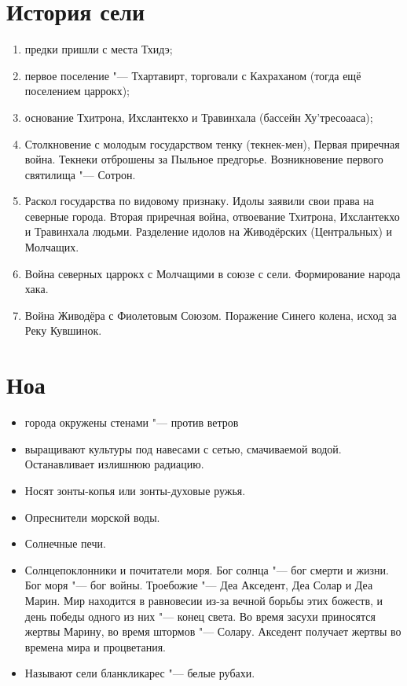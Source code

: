 \documentclass[a4paper,10pt]{book}
\begin{document}
\section{История сели}

\begin{enumerate}
\item предки пришли с места Тхидэ;
\item первое поселение "--- Тхартавирт, торговали с Кахраханом (тогда ещё 
поселением 
царрокх);
\item основание Тхитрона, Ихслантекхо и Травинхала (бассейн Ху'тресоааса);
\item Столкновение с молодым государством тенку (текнек-мен), Первая приречная 
война. 
Текнеки отброшены за Пыльное предгорье. Возникновение первого святилища "--- 
Сотрон.
\item Раскол государства по видовому признаку. Идолы заявили свои права на 
северные 
города. Вторая приречная война, отвоевание Тхитрона, Ихслантекхо и Травинхала 
людьми. Разделение идолов на Живодёрских (Центральных) и Молчащих.
\item Война северных царрокх с Молчащими в союзе с сели. Формирование народа 
хака.
\item Война Живодёра с Фиолетовым Союзом. Поражение Синего колена, исход за 
Реку 
Кувшинок.
\end{enumerate}

\section{Ноа}

\begin{itemize}
\item города окружены стенами "--- против ветров
\item выращивают культуры под навесами с сетью, смачиваемой водой. 
Останавливает 
излишнюю радиацию.
\item Носят зонты-копья или зонты-духовые ружья.
\item Опреснители морской воды.
\item Солнечные печи.
\item Солнцепоклонники и почитатели моря. Бог солнца "--- бог смерти и жизни. 
Бог моря "--- бог войны. Троебожие "--- Деа Акседент, Деа Солар и Деа Марин. 
Мир 
находится в равновесии из-за вечной борьбы этих божеств, и день победы одного 
из 
них "--- конец света. Во время засухи приносятся жертвы Марину, во время 
штормов 
"--- Солару. Акседент получает жертвы во времена мира и процветания.
\item Называют сели бланкликарес "--- белые рубахи.
\end{itemize}
\end{document}
